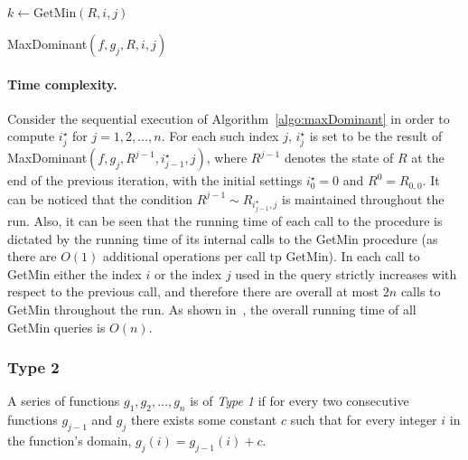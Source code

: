 
\begin{algorithm}
	$k \gets \text{GetMin}(R, i, j)$\;
	\;
	\caption{MaxDominant$(f, g_j, R, i, j)$}
	\label{algo:maxDominant}
\end{algorithm}


\paragraph{Time complexity.}
Consider the sequential execution of Algorithm~\ref{algo:maxDominant} in order to compute $i^\star_j$ for $j = 1, 2, \ldots, n$. For each such index $j$, $i^\star_j$ is set to be the result of MaxDominant$(f, g_j, R^{j-1}, i^\star_{j-1}, j)$, where $R^{j-1}$ denotes the state of $R$ at the end of the previous iteration, with the initial settings $i^\star_0 = 0$ and $R^0 = R_{0, 0}$. It can be noticed that the condition $R^{j-1} \sim R_{i^\star_{j-1}, j}$ is maintained throughout the run. Also, it can be seen that the running time of each call to the procedure is dictated by the running time of its internal calls to the GetMin procedure (as there are $O(1)$ additional operations per call tp GetMin). In each call to GetMin either the index $i$ or the index $j$ used in the query strictly increases with respect to the previous call, and therefore there are overall at most $2n$ calls to GetMin throughout the run. As shown in~\cite{lee2007simple}, the overall running time of all GetMin queries is $O(n)$.


\subsubsection{Type 2}
A series of functions $g_1, g_2, \ldots, g_n$ is of \emph{Type 1} if for every two consecutive functions $g_{j-1}$ and $g_j$ there exists some constant $c$ such that for every integer $i$ in the function's domain, $g_j(i) = g_{j-1}(i) + c$.
